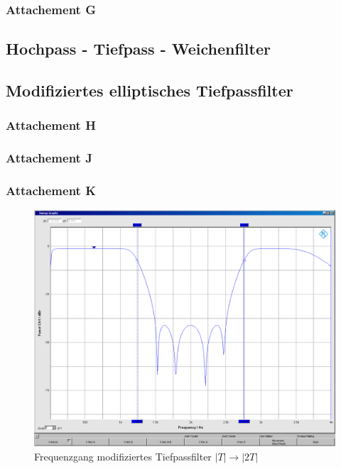 \subsubsection{Attachement G}

\subsection{Hochpass - Tiefpass - Weichenfilter}

\subsection{Modifiziertes elliptisches Tiefpassfilter}
\subsubsection{Attachement H}

\subsubsection{Attachement J}

\subsubsection{Attachement K}

	\begin{figure}[h]
		\centering
		\includegraphics[width=0.7\linewidth]{Bilder/ellip2T}
		\caption{Frequenzgang modifiziertes Tiefpassfilter $|T| \rightarrow |2T|$}
		\label{fig:ellip2T}
	\end{figure}
